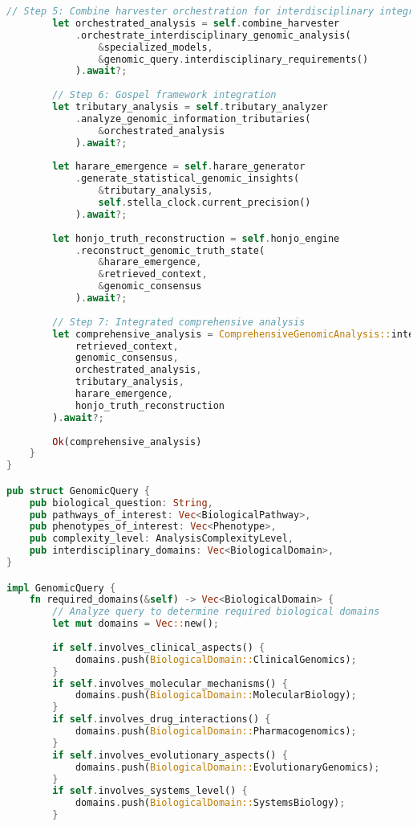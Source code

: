 \documentclass[12pt,a4paper]{article}
\begin{document}
\begin{lstlisting}[language=Rust, caption=Integrated Buhera-East Gospel Genomic System]
        // Step 5: Combine harvester orchestration for interdisciplinary integration
        let orchestrated_analysis = self.combine_harvester
            .orchestrate_interdisciplinary_genomic_analysis(
                &specialized_models,
                &genomic_query.interdisciplinary_requirements()
            ).await?;
        
        // Step 6: Gospel framework integration
        let tributary_analysis = self.tributary_analyzer
            .analyze_genomic_information_tributaries(
                &orchestrated_analysis
            ).await?;
        
        let harare_emergence = self.harare_generator
            .generate_statistical_genomic_insights(
                &tributary_analysis,
                self.stella_clock.current_precision()
            ).await?;
        
        let honjo_truth_reconstruction = self.honjo_engine
            .reconstruct_genomic_truth_state(
                &harare_emergence,
                &retrieved_context,
                &genomic_consensus
            ).await?;
        
        // Step 7: Integrated comprehensive analysis
        let comprehensive_analysis = ComprehensiveGenomicAnalysis::integrate(
            retrieved_context,
            genomic_consensus,
            orchestrated_analysis,
            tributary_analysis,
            harare_emergence,
            honjo_truth_reconstruction
        ).await?;
        
        Ok(comprehensive_analysis)
    }
}

pub struct GenomicQuery {
    pub biological_question: String,
    pub pathways_of_interest: Vec<BiologicalPathway>,
    pub phenotypes_of_interest: Vec<Phenotype>,
    pub complexity_level: AnalysisComplexityLevel,
    pub interdisciplinary_domains: Vec<BiologicalDomain>,
}

impl GenomicQuery {
    fn required_domains(&self) -> Vec<BiologicalDomain> {
        // Analyze query to determine required biological domains
        let mut domains = Vec::new();
        
        if self.involves_clinical_aspects() {
            domains.push(BiologicalDomain::ClinicalGenomics);
        }
        if self.involves_molecular_mechanisms() {
            domains.push(BiologicalDomain::MolecularBiology);
        }
        if self.involves_drug_interactions() {
            domains.push(BiologicalDomain::Pharmacogenomics);
        }
        if self.involves_evolutionary_aspects() {
            domains.push(BiologicalDomain::EvolutionaryGenomics);
        }
        if self.involves_systems_level() {
            domains.push(BiologicalDomain::SystemsBiology);
        }
        

\end{lstlisting}
\end{document}
